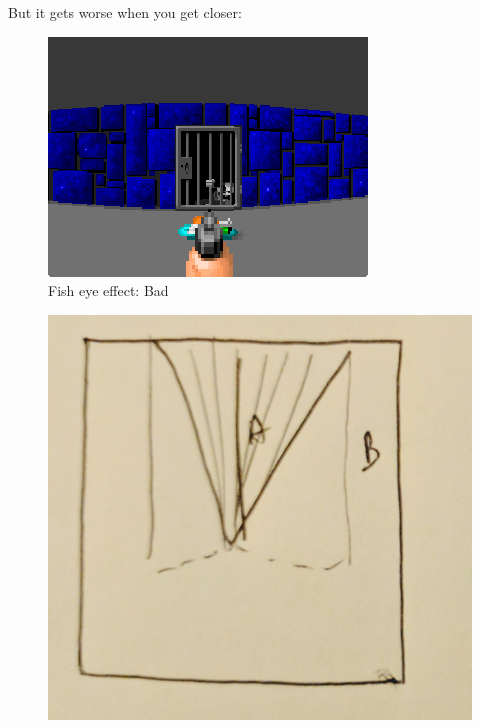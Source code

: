But it gets worse when you get closer:
\begin{figure}[H]
\centering
 \includegraphics[width=\textwidth]{screenshots/fish_eye/bad_ok.png}
 \caption{Fish eye effect: Bad} \label{fig:mips}
 \end{figure}
 \begin{figure}[H]
  \centering
 \includegraphics[width=.3\textwidth]{imgs/drawings/fish_eye/fish_eye_top_mid.png}
\end{figure}
\par

